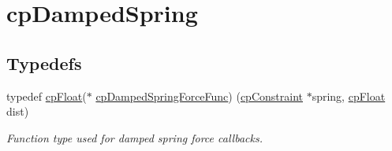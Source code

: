 \hypertarget{group__cp_damped_spring}{}\section{cp\+Damped\+Spring}
\label{group__cp_damped_spring}
\subsection*{Typedefs}
\begin{DoxyCompactItemize}
\item 
\mbox{\label{group__cp_damped_spring_gad88d8466e0057d4ad05183fb14fa274d}} 
typedef \mbox{\hyperlink{group__basic_types_gac1ed65573e035bf892505768c852d8d3}{cp\+Float}}($\ast$ \mbox{\hyperlink{group__cp_damped_spring_gad88d8466e0057d4ad05183fb14fa274d}{cp\+Damped\+Spring\+Force\+Func}}) (\mbox{\hyperlink{structcp_constraint}{cp\+Constraint}} $\ast$spring, \mbox{\hyperlink{group__basic_types_gac1ed65573e035bf892505768c852d8d3}{cp\+Float}} dist)
\begin{DoxyCompactList}\small\item\em Function type used for damped spring force callbacks. \end{DoxyCompactList}\end{DoxyCompactItemize}
